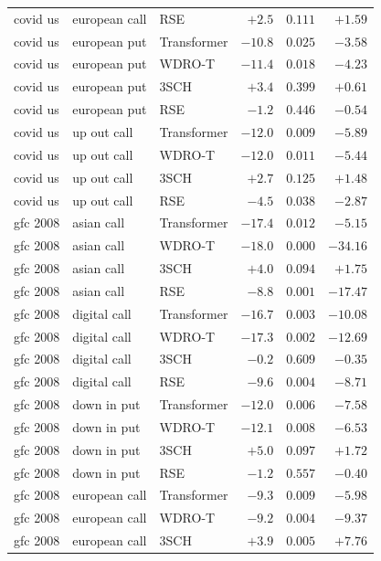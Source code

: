 \documentclass[11pt,oneside]{report}
\begin{document}
\begin{longtable}{lllrrr}
covid us & european call & RSE      & $+2.5$  & $0.111$ & $+1.59$ \\
covid us & european put & Transformer & $-10.8$ & $0.025$ & $-3.58$ \\
covid us & european put & WDRO-T    & $-11.4$ & $0.018$ & $-4.23$ \\
covid us & european put & 3SCH      & $+3.4$  & $0.399$ & $+0.61$ \\
covid us & european put & RSE       & $-1.2$  & $0.446$ & $-0.54$ \\
covid us & up out call & Transformer & $-12.0$ & $0.009$ & $-5.89$ \\
covid us & up out call & WDRO-T     & $-12.0$ & $0.011$ & $-5.44$ \\
covid us & up out call & 3SCH       & $+2.7$  & $0.125$ & $+1.48$ \\
covid us & up out call & RSE        & $-4.5$  & $0.038$ & $-2.87$ \\
\midrule
gfc 2008 & asian call & Transformer & $-17.4$ & $0.012$ & $-5.15$ \\
gfc 2008 & asian call & WDRO-T      & $-18.0$ & $0.000$ & $-34.16$ \\
gfc 2008 & asian call & 3SCH        & $+4.0$  & $0.094$ & $+1.75$ \\
gfc 2008 & asian call & RSE         & $-8.8$  & $0.001$ & $-17.47$ \\
gfc 2008 & digital call & Transformer & $-16.7$ & $0.003$ & $-10.08$ \\
gfc 2008 & digital call & WDRO-T    & $-17.3$ & $0.002$ & $-12.69$ \\
gfc 2008 & digital call & 3SCH      & $-0.2$  & $0.609$ & $-0.35$ \\
gfc 2008 & digital call & RSE       & $-9.6$  & $0.004$ & $-8.71$ \\
gfc 2008 & down in put & Transformer & $-12.0$ & $0.006$ & $-7.58$ \\
gfc 2008 & down in put & WDRO-T     & $-12.1$ & $0.008$ & $-6.53$ \\
gfc 2008 & down in put & 3SCH       & $+5.0$  & $0.097$ & $+1.72$ \\
gfc 2008 & down in put & RSE        & $-1.2$  & $0.557$ & $-0.40$ \\
gfc 2008 & european call & Transformer & $-9.3$  & $0.009$ & $-5.98$ \\
gfc 2008 & european call & WDRO-T   & $-9.2$  & $0.004$ & $-9.37$ \\
gfc 2008 & european call & 3SCH     & $+3.9$  & $0.005$ & $+7.76$ \\

\end{longtable}
\end{document}
